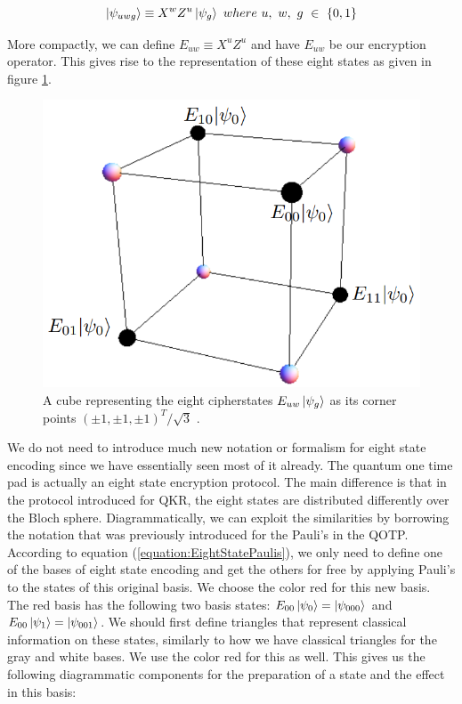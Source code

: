 \documentclass[]{article}
\begin{document}
\begin{equation}
	\label{equation:EightStatePaulis}
	\ket{\psi_{uwg}} \equiv X^w Z^u\ket{\psi_{g}}~where~ u,~ w,~ g~ \in~ \{0,1\}
\end{equation}

More compactly, we can define $E_{uw} \equiv X^u Z^u$ and have $E_{uw}$ be our encryption operator. This gives rise to the representation of these eight states as given in figure \ref{fig:eightstatecube}.

\begin{center}
\begin{figure}
	\begin{center}
	\includegraphics[width=0.5\linewidth]{Eightstatecube.png}
	\caption{A cube representing the eight cipherstates $E_{uw}\ket{\psi_{g}}$ as its corner points $(\pm1,\pm1,\pm1)^T/\sqrt{3}$ \cite{DeVries2016}.}
	\label{fig:eightstatecube}
	\end{center}
\end{figure}
\end{center}

We do not need to introduce much new notation or formalism for eight state encoding since we have essentially seen most of it already. The quantum one time pad is actually an eight state encryption protocol. The main difference is that in the protocol introduced for QKR, the eight states are distributed differently over the Bloch sphere. Diagrammatically, we can exploit the similarities by borrowing the notation that was previously introduced for the Pauli's in the QOTP. According to equation (\ref{equation:EightStatePaulis}), we only need to define one of the bases of eight state encoding and get the others for free by applying Pauli's to the states of this original basis. We choose the color red for this new basis. The red basis has the following two basis states: $E_{00}\ket{\psi_{0}} = \ket{\psi_{000}}$ and $E_{00}\ket{\psi_{1}} = \ket{\psi_{001}}$. We should first define triangles that represent classical information on these states, similarly to how we have classical triangles for the gray and white bases. We use the color red for this as well. This gives us the following diagrammatic components for the preparation of a state and the effect in this basis:
\end{document}
